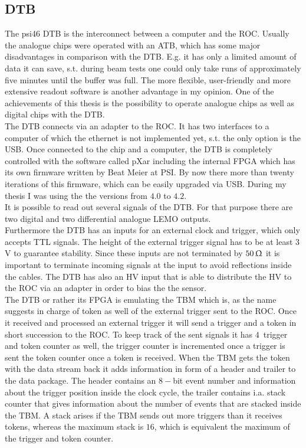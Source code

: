 \documentclass[british,11pt,a4paper]{memoir}
\begin{document}
\subsection{\ac{DTB}}\label{sdtb}
The psi46 \ac{DTB} is the interconnect between a computer and the \ac{ROC}. Usually the analogue chips were operated with an \ac{ATB}, which has some major disadvantages in comparison with the \ac{DTB}. E.g. it has only a limited amount of data it can save, s.t. during beam tests one could only take runs of approximately five minutes until the buffer was full. The more flexible, user-friendly and more extensive readout software is another advantage in my opinion. One of the achievements of this thesis is the possibility to operate analogue chips as well as digital chips with the \ac{DTB}.\\
The \ac{DTB} connects via an adapter to the \ac{ROC}. It has two interfaces to a computer of which the ethernet is not implemented yet, s.t. the only option is the USB. Once connected to the chip and a computer, the \ac{DTB} is completely controlled with the software called pXar including the internal \ac{FPGA} which has its own firmware written by Beat Meier at \ac{PSI}. By now there more than twenty iterations of this firmware, which can be easily upgraded via USB. During my thesis I was using the the versions from $4.0$ to $4.2$.\\
It is possible to read out several signals of the \ac{DTB}. For that purpose there are two digital and two differential analogue LEMO outputs.\\
Furthermore the \ac{DTB} has an inputs for an external clock and trigger, which only accepts \ac{TTL} signals. The height of the external trigger signal has to be at least $3\,$V to guarantee stability. Since these inputs are not terminated by $50\,\Upomega$ it is important to terminate incoming signals at the input to avoid reflections inside the cables. The \ac{DTB} has also an \ac{HV} input that is able to distribute the \ac{HV} to the \ac{ROC} via an adapter in order to bias the the sensor.\\
The \ac{DTB} or rather its \ac{FPGA} is emulating the \ac{TBM} which is, as the name suggests in charge of token as well of the external trigger sent to the \ac{ROC}. Once it received and processed an external trigger it will send a trigger and a token in short succession to the \ac{ROC}. To keep track of the sent signals it has $4\,$ trigger and token counter as well, the trigger counter is incremented once a trigger is sent the token counter once a token is received. When the \ac{TBM} gets the token with the data stream back it adds information in form of a header and trailer to the data package. The header contains an $8-$bit event number and information about the trigger position inside the clock cycle, the trailer contains i.a. stack counter that gives information about the number of events that are stacked inside the \ac{TBM}. A stack arises if the \ac{TBM} sends out more triggers than it receives tokens, whereas the maximum stack is $16$, which is equivalent the maximum of the trigger and token counter.\\
\end{document}
